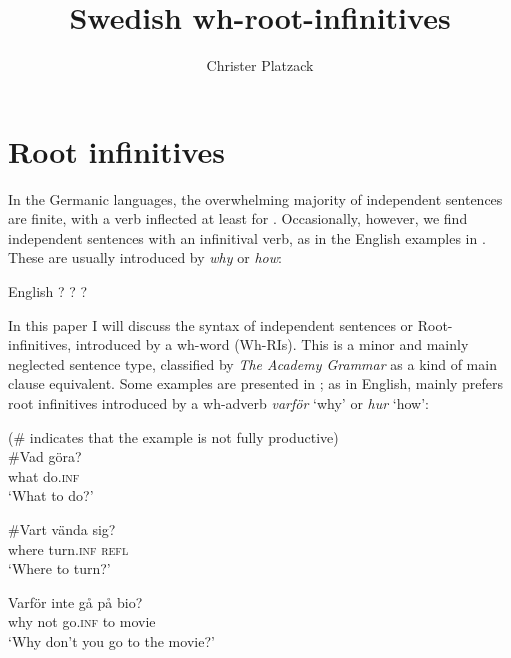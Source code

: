 \documentclass[output=paper]{LSP/langsci}
\author{Christer Platzack \affiliation{Lund University}
}
\title{Swedish wh-root-infinitives}
\begin{document}





\section{Root infinitives}

In the Germanic languages, the overwhelming majority of independent sentences are finite, with a verb inflected at least for . Occasionally, however, we find independent sentences with an infinitival verb, as in the English examples in . These are usually introduced by \textit{why} or \textit{how}:

\noindent\parbox{\textwidth}{\ea%
    \label{ex:platzack:1}
    English \citep[874]{HuddlestonPullum2003}
    ?
    ?
    ?
    \z
    \z}

	

In this paper I will discuss the syntax of  independent  sentences or Root-infinitives, introduced by a wh-word (Wh-RIs). This is a minor and mainly neglected sentence type, classified by \textit{The  Academy Grammar} \citep[IV: 826--827]{TelemanEtAl1999} as a kind of main clause equivalent. Some  examples are presented in ; as in English,  mainly prefers root infinitives introduced by a wh-adverb \textit{varför} ‘why’ or \textit{hur} ‘how’:

\ea%
    \label{ex:platzack:2}
    	         (\# indicates that the example is not fully productive)\\
   \ea
\gll \#Vad göra?                     \\
      what  do.\textsc{inf}  \\
\glt   ‘What to do?’                       

   \ex
\gll \#Vart    vända    sig?\\
      where  turn.\textsc{inf}    \textsc{refl}\\
\glt   ‘Where to turn?’

   \ex
\gll Varför  inte  gå      på   bio?\\
      why    not  go.\textsc{inf}  to  movie\\
\glt   ‘Why don’t you go to the movie?’
\end{document}
